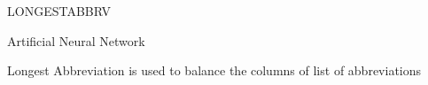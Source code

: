 \begin{theglossary}{LONGESTABBRV}
\item[ANN] Artificial Neural Network
\item[LONGESTABBRV] Longest Abbreviation is used to balance the columns of list of abbreviations
\end{theglossary}
